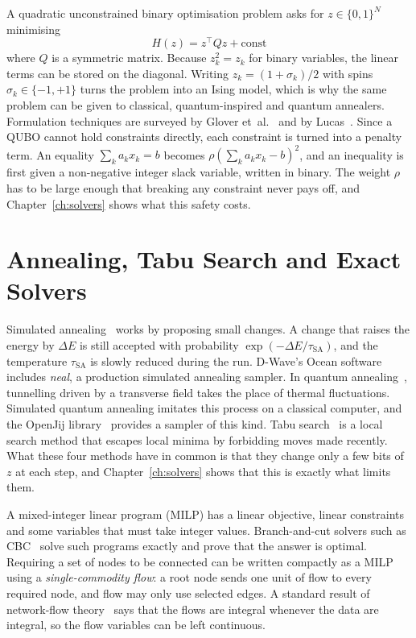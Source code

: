 A quadratic unconstrained binary optimisation problem asks for
$z\in\{0,1\}^N$ minimising
\begin{equation}
H(z)=z^{\top}Qz+\mathrm{const}
\label{eq:bg:qubo}
\end{equation}
where $Q$ is a symmetric matrix. Because $z_k^2=z_k$ for binary variables,
the linear terms can be stored on the diagonal. Writing $z_k=(1+\sigma_k)/2$
with spins $\sigma_k\in\{-1,+1\}$ turns the problem into an Ising model, which
is why the same problem can be given to classical, quantum-inspired and quantum
annealers. Formulation techniques are surveyed by Glover
et~al.~\cite{glover2019} and by Lucas~\cite{lucas2014}. Since a QUBO cannot
hold constraints directly, each constraint is turned into a penalty term. An
equality $\sum_ka_kx_k=b$ becomes $\rho(\sum_ka_kx_k-b)^2$, and an inequality
is first given a non-negative integer slack variable, written in binary. The
weight $\rho$ has to be large enough that breaking any constraint never pays
off, and Chapter~\ref{ch:solvers} shows what this safety costs.

\section{Annealing, Tabu Search and Exact Solvers}

Simulated annealing~\cite{kirkpatrick1983} works by proposing small changes.
A change that raises the energy by $\Delta E$ is still accepted with
probability $\exp(-\Delta E/\tau_{\mathrm{SA}})$, and the temperature
$\tau_{\mathrm{SA}}$ is slowly reduced during the run. D-Wave's Ocean
software~\cite{ocean} includes \emph{neal}, a production simulated annealing
sampler. In quantum annealing~\cite{kadowaki1998}, tunnelling driven by a
transverse field takes the place of thermal fluctuations. Simulated quantum
annealing imitates this process on a classical computer, and the OpenJij
library~\cite{openjij} provides a sampler of this kind. Tabu
search~\cite{glover1989} is a local search method that escapes local minima by
forbidding moves made recently. What these four methods have in common is that
they change only a few bits of $z$ at each step, and Chapter~\ref{ch:solvers}
shows that this is exactly what limits them.

A mixed-integer linear program (MILP) has a linear objective, linear
constraints and some variables that must take integer values. Branch-and-cut
solvers such as CBC~\cite{cbc} solve such programs exactly and prove that the
answer is optimal. Requiring a set of nodes to be connected can be written
compactly as a MILP using a \emph{single-commodity flow}: a root node sends one
unit of flow to every required node, and flow may only use selected edges. A
standard result of network-flow theory~\cite{ahuja1993} says that the flows are
integral whenever the data are integral, so the flow variables can be left
continuous.

